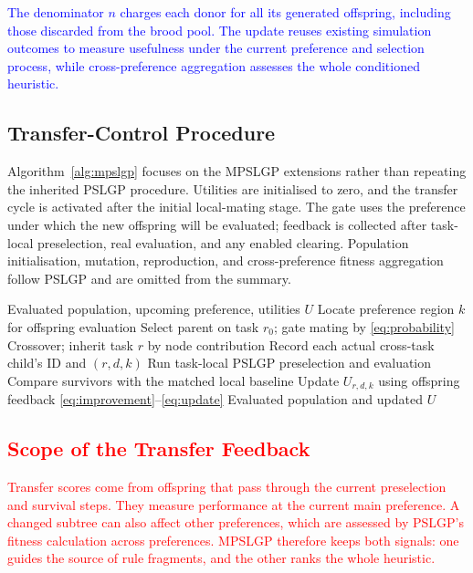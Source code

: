 \documentclass[10pt,journal]{IEEEtran}
\newcommand{\revision}[1]{\textcolor{blue}{#1}}
\newcommand{\ablationrevision}[1]{\textcolor{red}{#1}}
\begin{document}
\revision{The denominator $n$ charges each donor for all its generated offspring, including those discarded from the brood pool. The update reuses existing simulation outcomes to measure usefulness under the current preference and selection process, while cross-preference aggregation assesses the whole conditioned heuristic.}

\subsection{Transfer-Control Procedure}
Algorithm~\ref{alg:mpslgp} focuses on the MPSLGP extensions rather than repeating the inherited PSLGP procedure. Utilities are initialised to zero, and the transfer cycle is activated after the initial local-mating stage. The gate uses the preference under which the new offspring will be evaluated; feedback is collected after task-local preselection, real evaluation, and any enabled clearing. Population initialisation, mutation, reproduction, and cross-preference fitness aggregation follow PSLGP and are omitted from the summary.

\begin{algorithm}[t]
\caption{MPSLGP transfer and feedback}
\label{alg:mpslgp}
\begin{algorithmic}[1]
\REQUIRE Evaluated population, upcoming preference, utilities $U$
\STATE Locate preference region $k$ for offspring evaluation
    \STATE Select parent on task $r_0$; gate mating by \eqref{eq:probability}
    \STATE Crossover; inherit task $r$ by node contribution
    \STATE Record each actual cross-task child's ID and $(r,d,k)$
\ENDFOR
\STATE Run task-local PSLGP preselection and evaluation
    \STATE Compare survivors with the matched local baseline
    \STATE Update $U_{r,d,k}$ using offspring feedback \eqref{eq:improvement}--\eqref{eq:update}
\ENDFOR
\RETURN Evaluated population and updated $U$
\end{algorithmic}
\end{algorithm}

\subsection{\ablationrevision{Scope of the Transfer Feedback}}
\ablationrevision{Transfer scores come from offspring that pass through the current preselection and survival steps. They measure performance at the current main preference. A changed subtree can also affect other preferences, which are assessed by PSLGP's fitness calculation across preferences. MPSLGP therefore keeps both signals: one guides the source of rule fragments, and the other ranks the whole heuristic.}
\end{document}
